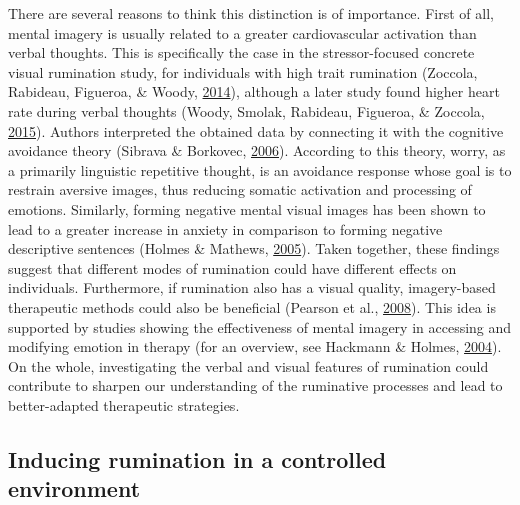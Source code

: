 \documentclass[a4paper,12pt,twoside,openright,oldfontcommands]{memoir}
\begin{document}
There are several reasons to think this distinction is of importance. First of all, mental imagery is usually related to a greater cardiovascular activation than verbal thoughts. This is specifically the case in the stressor-focused concrete visual rumination study, for individuals with high trait rumination (Zoccola, Rabideau, Figueroa, \& Woody, \protect\hyperlink{ref-zoccola_cardiovascular_2014}{2014}), although a later study found higher heart rate during verbal thoughts (Woody, Smolak, Rabideau, Figueroa, \& Zoccola, \protect\hyperlink{ref-woody_trait_2015}{2015}). Authors interpreted the obtained data by connecting it with the cognitive avoidance theory (Sibrava \& Borkovec, \protect\hyperlink{ref-davey_cognitive_2006}{2006}). According to this theory, worry, as a primarily linguistic repetitive thought, is an avoidance response whose goal is to restrain aversive images, thus reducing somatic activation and processing of emotions. Similarly, forming negative mental visual images has been shown to lead to a greater increase in anxiety in comparison to forming negative descriptive sentences (Holmes \& Mathews, \protect\hyperlink{ref-holmes_mental_2005}{2005}). Taken together, these findings suggest that different modes of rumination could have different effects on individuals. Furthermore, if rumination also has a visual quality, imagery-based therapeutic methods could also be beneficial (Pearson et al., \protect\hyperlink{ref-pearson_frequency_2008}{2008}). This idea is supported by studies showing the effectiveness of mental imagery in accessing and modifying emotion in therapy (for an overview, see Hackmann \& Holmes, \protect\hyperlink{ref-hackmann_reflecting_2004}{2004}). On the whole, investigating the verbal and visual features of rumination could contribute to sharpen our understanding of the ruminative processes and lead to better-adapted therapeutic strategies.

\hypertarget{inducing-rumination-in-a-controlled-environment}{%
\subsection{Inducing rumination in a controlled environment}\label{inducing-rumination-in-a-controlled-environment}}
\end{document}
